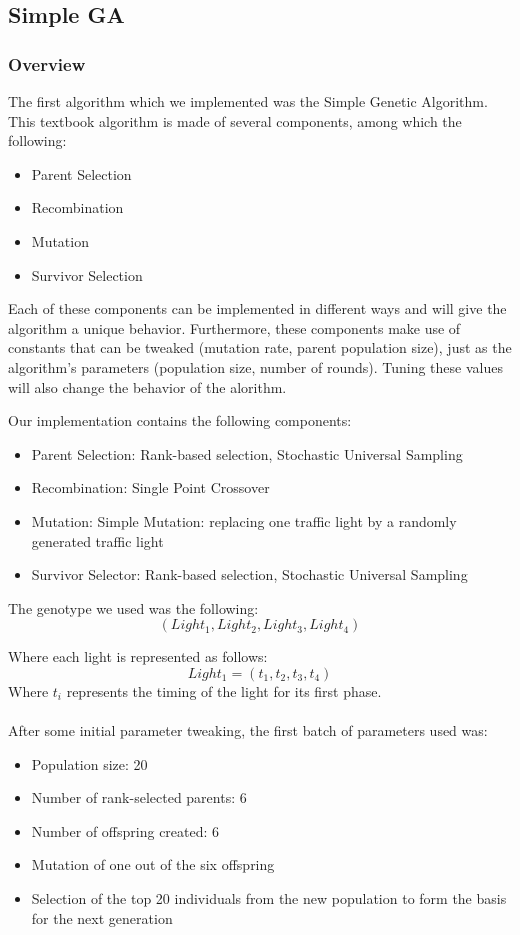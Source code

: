 \documentclass{article} %
\begin{document}
\subsection{Simple GA}

\subsubsection{Overview}
The first algorithm which we implemented was the Simple Genetic Algorithm. This textbook algorithm is made of several components, among which the following:
\begin{itemize}
 \item Parent Selection
 \item Recombination
 \item Mutation
 \item Survivor Selection
\end{itemize}
Each of these components can be implemented in different ways and will give the algorithm a unique behavior. Furthermore, these components make use of constants that can be tweaked (mutation rate, parent population size), just as the algorithm's parameters (population size, number of rounds). Tuning these values will also change the behavior of the alorithm.

Our implementation contains the following components:
\begin{itemize}
 \item Parent Selection: Rank-based selection, Stochastic Universal Sampling
 \item Recombination: Single Point Crossover
 \item Mutation: Simple Mutation: replacing one traffic light by a randomly generated traffic light
 \item Survivor Selector: Rank-based selection, Stochastic Universal Sampling
\end{itemize}

The genotype we used was the following:
\begin{equation}
  (Light_1, Light_2, Light_3, Light_4)
\end{equation}

Where each light is represented as follows:
\begin{equation}
 Light_1 = (t_1, t_2, t_3, t_4)
\end{equation}
Where $t_i$ represents the timing of the light for its first phase. \\
$\;$\\
After some initial parameter tweaking, the first batch of parameters used was:
\begin{itemize}
 \item Population size: 20
 \item Number of rank-selected parents: 6
 \item Number of offspring created: 6
 \item Mutation of one out of the six offspring
 \item Selection of the top 20 individuals from the new population to form the basis for the next generation
\end{itemize}
\end{document}
